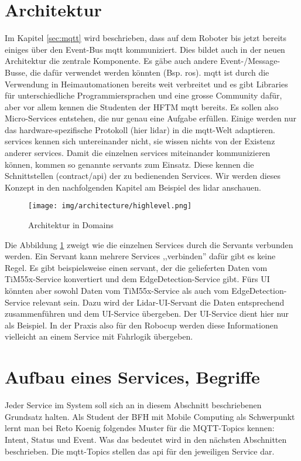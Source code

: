 \section{Architektur}
Im Kapitel \ref{sec:mqtt} wird beschrieben, dass auf dem Roboter bis jetzt bereits einiges über den Event-Bus \acrshort{mqtt} kommuniziert. Dies bildet auch in der neuen Architektur die zentrale Komponente. Es gäbe auch andere Event-/Message-Busse, die dafür verwendet werden könnten (Bsp. \acrshort{ros}). \acrshort{mqtt} ist durch die Verwendung in Heimautomationen bereits weit verbreitet und es gibt Libraries für unterschiedliche Programmiersprachen und eine grosse Community dafür, aber vor allem kennen die Studenten der HFTM \acrshort{mqtt} bereits. Es sollen also Micro-Services entstehen, die nur genau eine Aufgabe erfüllen. Einige werden nur das hardware-spezifische Protokoll (hier \acrshort{lidar}) in die \acrshort{mqtt}-Welt adaptieren. \Glspl{service} kennen sich untereinander nicht, sie wissen nichts von der Existenz anderer \glspl{service}. Damit die einzelnen \Glspl{service} miteinander kommunizieren können, kommen so genannte \Glspl{servant} zum Einsatz. Diese kennen die Schnittstellen (\gls{contract}/\acrshort{api}) der zu bedienenden Services. Wir werden dieses Konzept in den nachfolgenden Kapitel am Beispiel des \acrshort{lidar} anschauen.

\begin{figure}[H]
	\centering
	\texttt{[image: img/architecture/highlevel.png]}
	\caption{Architektur in Domains}
	\label{fig:architecture_highlevel}
\end{figure}

Die Abbildung \ref{fig:architecture_highlevel} zweigt wie die einzelnen Services  durch die Servants verbunden werden. Ein Servant kann mehrere Services ,,verbinden'' dafür gibt es keine Regel. Es gibt beispielsweise einen \Gls{servant}, der die gelieferten Daten vom TiM55x-Service konvertiert und dem EdgeDetection-Service gibt. Fürs UI könnten aber sowohl Daten vom TiM55x-Service als auch vom EdgeDetection-Service relevant sein. Dazu wird der Lidar-UI-Servant die Daten entsprechend zusammenführen und dem UI-Service übergeben. Der UI-Service dient hier nur als Beispiel. In der Praxis also für den Robocup werden diese Informationen vielleicht an einem Service mit Fahrlogik übergeben.

\section{Aufbau eines Services, Begriffe}
\label{sec:isePattern}
Jeder Service im System soll sich an in diesem Abschnitt beschriebenen Grundsatz halten. Als Student der BFH mit Mobile Computing als Schwerpunkt lernt man bei Reto Koenig folgendes Muster für die MQTT-Topics kennen: Intent, Status und Event. Was das bedeutet wird in den nächsten Abschnitten beschrieben. Die \acrshort{mqtt}-Topics stellen das \acrshort{api} für den jeweiligen Service dar.

